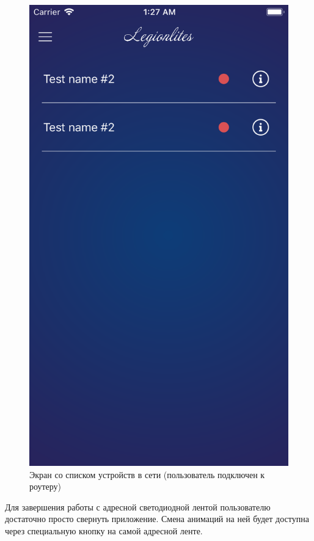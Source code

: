 \begin{figure}[H]
\centering
	\includegraphics[scale=0.2]{figures/userGuide/deviceList.png}
	\caption{Экран со списком устройств в сети (пользователь подключен к роутеру)}
	\label{fig:develop:userGuide:deviceList}
\end{figure}
\vspace*{-1pt}
Для завершения работы с адресной светодиодной лентой пользователю достаточно просто свернуть приложение. Смена анимаций на ней будет доступна через специальную кнопку на самой адресной ленте.

